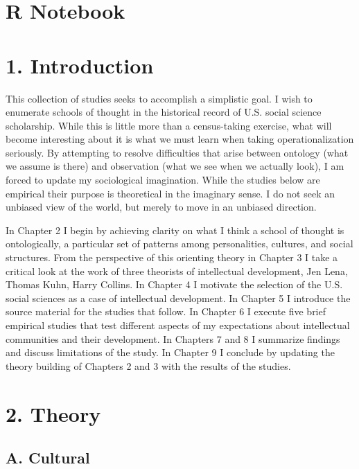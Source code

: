 \documentclass[]{article}
\date{}
\begin{document}
\section{R Notebook}\label{r-notebook}

\section{1. Introduction}\label{introduction}

This collection of studies seeks to accomplish a simplistic goal. I wish
to enumerate schools of thought in the historical record of U.S. social
science scholarship. While this is little more than a census-taking
exercise, what will become interesting about it is what we must learn
when taking operationalization seriously. By attempting to resolve
difficulties that arise between ontology (what we assume is there) and
observation (what we see when we actually look), I am forced to update
my sociological imagination. While the studies below are empirical their
purpose is theoretical in the imaginary sense. I do not seek an unbiased
view of the world, but merely to move in an unbiased direction.

In Chapter 2 I begin by achieving clarity on what I think a school of
thought is ontologically, a particular set of patterns among
personalities, cultures, and social structures. From the perspective of
this orienting theory in Chapter 3 I take a critical look at the work of
three theorists of intellectual development, Jen Lena, Thomas Kuhn,
Harry Collins. In Chapter 4 I motivate the selection of the U.S. social
sciences as a case of intellectual development. In Chapter 5 I introduce
the source material for the studies that follow. In Chapter 6 I execute
five brief empirical studies that test different aspects of my
expectations about intellectual communities and their development. In
Chapters 7 and 8 I summarize findings and discuss limitations of the
study. In Chapter 9 I conclude by updating the theory building of
Chapters 2 and 3 with the results of the studies.

\section{2. Theory}\label{theory}

\subsection{A. Cultural}\label{a.-cultural}
\end{document}
